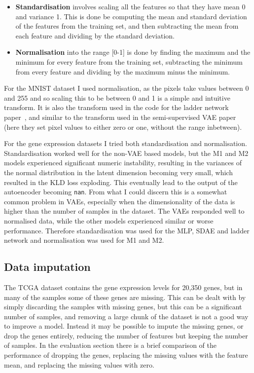 \documentclass[12pt,a4paper,twoside,openright]{report}
\begin{document}
\begin{itemize}
  \item \textbf{Standardisation} involves scaling all the features so that they have mean 0 and variance 1. This is done be computing the mean 
          and standard deviation of the features from the training set, and then subtracting the mean from each feature and dividing by the
          standard deviation.
  \item \textbf{Normalisation} into the range [0-1] is done by finding the maximum and the minimum for every feature from the training set,
          subtracting the minimum from every feature and dividing by the maximum minus the minimum.
\end{itemize}

For the MNIST dataset I used normalisation, as the pixels take values between 0 and 255 and so scaling this to be between 0 and 1 is 
a simple and intuitive transform. It is also the transform used in the code for the ladder network paper~\cite{DBLP:journals/corr/RasmusVHBR15}, 
and similar to the transform used in the semi-supervised VAE paper~\cite{DBLP:journals/corr/KingmaRMW14} (here they set pixel values to 
either zero or one, without the range inbetween).

For the gene expression datasets I tried both standardisation and normalisation. Standardisation worked well for the non-VAE based models,
but the M1 and M2 models experienced significant numeric instability, resulting in the variances of the normal distribution in the latent dimension 
becoming very small, which resulted in the KLD loss exploding.
This eventually lead to the output of the autoencoder becoming \texttt{nan}. From what I could discern this is a somewhat common problem in
VAEs, especially when the dimensionality of the data is higher than the number of samples in the dataset. The VAEs responded well to normalised
data, while the other models experienced similar or worse performance. Therefore standardisation was used for the MLP, SDAE and ladder 
network and normalisation was used for M1 and M2.

\subsection{Data imputation} \label{imput}
The TCGA dataset contains the gene expression levels for 20,350 genes, but in many of the samples some of these genes are missing.
This can be dealt with by simply discarding the samples with missing genes, but this can be a significant number of samples, and removing 
a large chunk of the dataset is not a good way to improve a model. Instead it may be possible to impute the missing genes, or drop the 
genes entirely, reducing the number of features but keeping the number of samples. In the evaluation section there is a brief comparison 
of the performance of dropping the genes, replacing the missing values with the feature mean, and replacing the missing values with zero.
\end{document}
